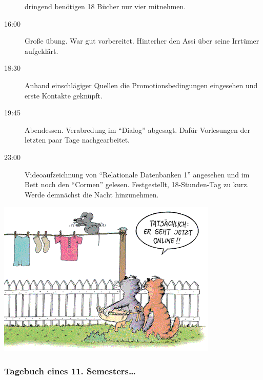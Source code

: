 \begin{description}
dringend benötigen 18 Bücher nur vier mitnehmen.
\item[16:00] Große übung. War gut vorbereitet. Hinterher den Assi über seine
Irrtümer aufgeklärt.
\item[18:30] Anhand einschlägiger Quellen die Promotionsbedingungen eingesehen und
erste Kontakte geknüpft.
\item[19:45] Abendessen. Verabredung im "`Dialog"' abgesagt. Dafür Vorlesungen
der letzten paar Tage nachgearbeitet.
\item[23:00] Videoaufzeichnung von "`Relationale Datenbanken 1"' angesehen und im Bett noch den "`Cormen"'
gelesen. Festgestellt, 18-Stunden-Tag zu kurz. Werde demnächst die Nacht
hinzunehmen.
\end{description}
\begin{center}
  \includegraphics[width=\linewidth]{bilder/comics/stein1.png}
\end{center}
\newpage
\subsubsection{Tagebuch eines 11. Semesters\ldots}


